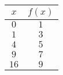 \begin{tabular}{cc} \toprule
$x$  & $f(x)$ \\\midrule
$0$  & $1$    \\[6pt]
$1$  & $3$    \\[6pt]
$4$  & $5$    \\[6pt]
$9$  & $7$    \\[6pt]
$16$ & $9$    \\\bottomrule
\end{tabular}
